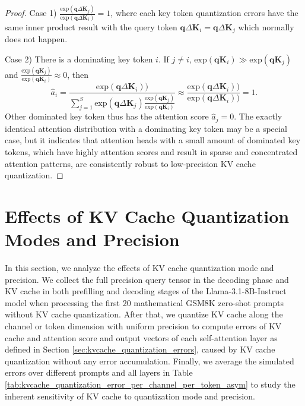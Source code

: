 \begin{proof}
Case 1) $\frac{\mbox{exp}(\boldsymbol{q} \Delta \boldsymbol{K}_j)}{\mbox{exp}(\boldsymbol{q} \Delta \boldsymbol{K}_i)}=1$, where each key token quantization errors have the same inner product result with the query token $\boldsymbol{q} \Delta \boldsymbol{K}_i=\boldsymbol{q} \Delta \boldsymbol{K}_j$ which normally does not happen. 

Case 2) There is a dominating key token $i$. If $j\neq i$,  $\mbox{exp}(\boldsymbol{q} \boldsymbol{K}_i) \gg \mbox{exp}(\boldsymbol{q} \boldsymbol{K}_j)$ and $\frac{\mbox{exp}(\boldsymbol{q} \boldsymbol{K}_j)}{\mbox{exp}(\boldsymbol{q} \boldsymbol{K}_i)} \approx 0$, then
\begin{equation}
\hat{a}_i = \frac{ \mbox{exp}(\boldsymbol{q} \Delta \boldsymbol{K}_i))}{\sum_{j=1}^{S} \mbox{exp}(\boldsymbol{q} \Delta \boldsymbol{K}_j)  \frac{\mbox{exp}(\boldsymbol{q} \boldsymbol{K}_j)}{\mbox{exp}(\boldsymbol{q} \boldsymbol{K}_i)}} \approx \frac{ \mbox{exp}(\boldsymbol{q} \Delta \boldsymbol{K}_i))}{\mbox{exp}(\boldsymbol{q} \Delta \boldsymbol{K}_i))} = 1.
\end{equation}
Other dominated key token thus has the attention score $\hat{a}_j=0$.
The exactly identical attention distribution with a dominating key token may be a special case, but it indicates that attention heads with a small amount of dominated key tokens, which have highly attention scores and result in sparse and concentrated attention patterns, are consistently robust to low-precision KV cache quantization.
\end{proof}

\section{Effects of KV Cache Quantization Modes and Precision}
\label{sec:kvquant_mode_precision}
In this section, we analyze the effects of KV cache quantization mode and precision. 
We collect the full precision query tensor in the decoding phase and KV cache in both prefilling and decoding stages of the Llama-3.1-8B-Instruct model when processing the first 20 mathematical GSM8K zero-shot prompts without KV cache quantization. After that, we quantize KV cache along the channel or token dimension with uniform precision to compute errors of KV cache and attention score and output vectors of each self-attention layer as defined in Section \ref{sec:kvcache_quantization_errors}, caused by KV cache quantization without any error accumulation.
Finally, we average the simulated errors over different prompts and all layers in Table \ref{tab:kvcache_quantization_error_per_channel_per_token_asym} to study the inherent sensitivity of KV cache to quantization mode and precision.

